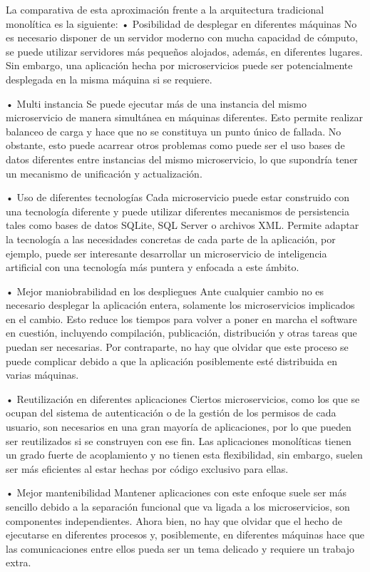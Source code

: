 \documentclass[11pt,spanish,listoffigures]{tfgetsinf}
\begin{document}
La comparativa de esta aproximación frente a la arquitectura tradicional monolítica es la siguiente:
•	Posibilidad de desplegar en diferentes máquinas
No es necesario disponer de un servidor moderno con mucha capacidad de cómputo, se puede utilizar servidores más pequeños alojados, además, en diferentes lugares. Sin embargo, una aplicación hecha por microservicios puede ser potencialmente desplegada en la misma máquina si se requiere.

•	Multi instancia
Se puede ejecutar más de una instancia del mismo microservicio de manera simultánea en máquinas diferentes. Esto permite realizar balanceo de carga y hace que no se constituya un punto único de fallada. No obstante, esto puede acarrear otros problemas como puede ser el uso bases de datos diferentes entre instancias del mismo microservicio, lo que supondría tener un mecanismo de unificación y actualización.

•	Uso de diferentes tecnologías
Cada microservicio puede estar construido con una tecnología diferente y puede utilizar diferentes mecanismos de persistencia tales como bases de datos SQLite, SQL Server o archivos XML. Permite adaptar la tecnología a las necesidades concretas de cada parte de la aplicación, por ejemplo, puede ser interesante desarrollar un microservicio de inteligencia artificial con una tecnología más puntera y enfocada a este ámbito.

•	Mejor maniobrabilidad en los despliegues
Ante cualquier cambio no es necesario desplegar la aplicación entera, solamente los microservicios implicados en el cambio. Esto reduce los tiempos para volver a poner en marcha el software en cuestión, incluyendo compilación, publicación, distribución y otras tareas que puedan ser necesarias. Por contraparte, no hay que olvidar que este proceso se puede complicar debido a que la aplicación posiblemente esté distribuida en varias máquinas.

•	Reutilización en diferentes aplicaciones
Ciertos microservicios, como los que se ocupan del sistema de autenticación o de la gestión de los permisos de cada usuario, son necesarios en una gran mayoría de aplicaciones, por lo que pueden ser reutilizados si se construyen con ese fin. Las aplicaciones monolíticas tienen un grado fuerte de acoplamiento y no tienen esta flexibilidad, sin embargo, suelen ser más eficientes al estar hechas por código exclusivo para ellas.

•	Mejor mantenibilidad
Mantener aplicaciones con este enfoque suele ser más sencillo debido a la separación funcional que va ligada a los microservicios, son componentes independientes. Ahora bien, no hay que olvidar que el hecho de ejecutarse en diferentes procesos y, posiblemente, en diferentes máquinas hace que las comunicaciones entre ellos pueda ser un tema delicado y requiere un trabajo extra.
\end{document}
